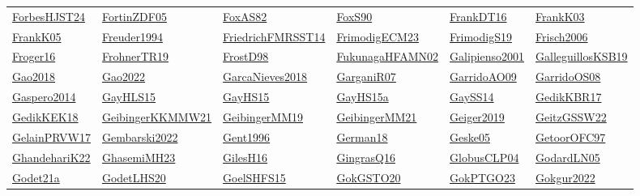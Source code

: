 \begin{longtable}{*{6}{l}}
\hyperref[detail:ForbesHJST24]{ForbesHJST24} & \hyperref[detail:FortinZDF05]{FortinZDF05} & \hyperref[detail:FoxAS82]{FoxAS82} & \hyperref[detail:FoxS90]{FoxS90} & \hyperref[detail:FrankDT16]{FrankDT16} & \hyperref[detail:FrankK03]{FrankK03}\\ 
\hyperref[detail:FrankK05]{FrankK05} & \hyperref[detail:Freuder1994]{Freuder1994} & \hyperref[detail:FriedrichFMRSST14]{FriedrichFMRSST14} & \hyperref[detail:FrimodigECM23]{FrimodigECM23} & \hyperref[detail:FrimodigS19]{FrimodigS19} & \hyperref[detail:Frisch2006]{Frisch2006}\\ 
\hyperref[detail:Froger16]{Froger16} & \hyperref[detail:FrohnerTR19]{FrohnerTR19} & \hyperref[detail:FrostD98]{FrostD98} & \hyperref[detail:FukunagaHFAMN02]{FukunagaHFAMN02} & \hyperref[detail:Galipienso2001]{Galipienso2001} & \hyperref[detail:GalleguillosKSB19]{GalleguillosKSB19}\\ 
\hyperref[detail:Gao2018]{Gao2018} & \hyperref[detail:Gao2022]{Gao2022} & \hyperref[detail:GarcaNieves2018]{GarcaNieves2018} & \hyperref[detail:GarganiR07]{GarganiR07} & \hyperref[detail:GarridoAO09]{GarridoAO09} & \hyperref[detail:GarridoOS08]{GarridoOS08}\\ 
\hyperref[detail:Gaspero2014]{Gaspero2014} & \hyperref[detail:GayHLS15]{GayHLS15} & \hyperref[detail:GayHS15]{GayHS15} & \hyperref[detail:GayHS15a]{GayHS15a} & \hyperref[detail:GaySS14]{GaySS14} & \hyperref[detail:GedikKBR17]{GedikKBR17}\\ 
\hyperref[detail:GedikKEK18]{GedikKEK18} & \hyperref[detail:GeibingerKKMMW21]{GeibingerKKMMW21} & \hyperref[detail:GeibingerMM19]{GeibingerMM19} & \hyperref[detail:GeibingerMM21]{GeibingerMM21} & \hyperref[detail:Geiger2019]{Geiger2019} & \hyperref[detail:GeitzGSSW22]{GeitzGSSW22}\\ 
\hyperref[detail:GelainPRVW17]{GelainPRVW17} & \hyperref[detail:Gembarski2022]{Gembarski2022} & \hyperref[detail:Gent1996]{Gent1996} & \hyperref[detail:German18]{German18} & \hyperref[detail:Geske05]{Geske05} & \hyperref[detail:GetoorOFC97]{GetoorOFC97}\\ 
\hyperref[detail:GhandehariK22]{GhandehariK22} & \hyperref[detail:GhasemiMH23]{GhasemiMH23} & \hyperref[detail:GilesH16]{GilesH16} & \hyperref[detail:GingrasQ16]{GingrasQ16} & \hyperref[detail:GlobusCLP04]{GlobusCLP04} & \hyperref[detail:GodardLN05]{GodardLN05}\\ 
\hyperref[detail:Godet21a]{Godet21a} & \hyperref[detail:GodetLHS20]{GodetLHS20} & \hyperref[detail:GoelSHFS15]{GoelSHFS15} & \hyperref[detail:GokGSTO20]{GokGSTO20} & \hyperref[detail:GokPTGO23]{GokPTGO23} & \hyperref[detail:Gokgur2022]{Gokgur2022}\\ 

\end{longtable}
